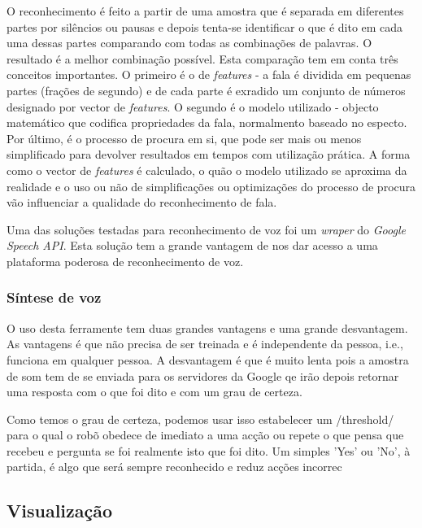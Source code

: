 \documentclass[journal]{IEEEtran}
\begin{document}
O reconhecimento é feito a partir de uma amostra que é separada em diferentes partes por silêncios ou pausas e depois tenta-se identificar o que é dito em cada uma dessas partes comparando com todas as combinações de palavras. O resultado é a melhor combinação possível. Esta comparação tem em conta três conceitos importantes. O primeiro é o de \textit{features} - a fala é dividida em pequenas partes (frações de segundo) e de cada parte é exradido um conjunto de números designado por vector de \textit{features}. O segundo é o modelo utilizado - objecto matemático que codifica propriedades da fala, normalmento baseado no especto. Por último, é o processo de procura em si, que pode ser mais ou menos simplificado para devolver resultados em tempos com utilização prática. A forma como o vector de \textit{features} é calculado, o quão o modelo utilizado se aproxima da realidade e o uso ou não de simplificações ou optimizações do processo de procura vão influenciar a qualidade do reconhecimento de fala.





Uma das soluções testadas para reconhecimento de voz foi um \textit{wraper} do \emph{Google Speech API}. Esta solução tem a grande vantagem de nos dar acesso a uma plataforma poderosa de reconhecimento de voz.

\subsubsection{Síntese de voz}



%


O uso desta ferramente tem duas grandes vantagens e uma grande desvantagem. As vantagens é que não precisa de ser treinada e é independente da pessoa, i.e., funciona em qualquer pessoa. A desvantagem é que é muito lenta pois a amostra de som tem de se enviada para os servidores da Google qe irão depois retornar uma resposta com o que foi dito e com um grau de certeza.

Como temos o grau de certeza, podemos usar isso estabelecer um /threshold/ para o qual o robõ obedece de imediato a uma acção ou repete o que pensa que recebeu e pergunta se foi realmente isto que foi dito. Um simples 'Yes' ou 'No', à partida, é algo que será sempre reconhecido e reduz acções incorrec


\subsection{Visualização}
\end{document}
